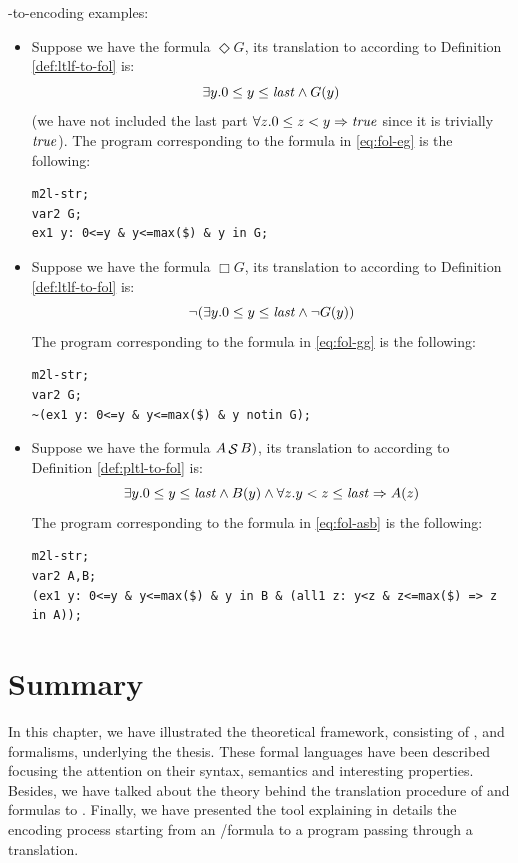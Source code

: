 \begin{example}
\FOL-to-\MONA encoding examples:\\
\begin{itemize}
\item Suppose we have the \LTLf formula $\Diamond G$, its translation to \FOL according to Definition \ref{def:ltlf-to-fol} is:
\begin{equation}\label{eq:fol-eg}
\exists y. 0 \le y \le \mathit{last} \wedge G(y)
\end{equation}
(we have not included the last part $\forall z. 0 \le z < y \Rightarrow \mathit{true}$ since it is trivially $\mathit{true}$).
The \MONA program corresponding to the formula in \ref{eq:fol-eg} is the following:
\begin{lstlisting}[style=mona]
m2l-str;
var2 G;
ex1 y: 0<=y & y<=max($) & y in G;
\end{lstlisting}

\item Suppose we have the \LTLf formula $\Box G$, its translation to \FOL according to Definition \ref{def:ltlf-to-fol} is:
\begin{equation}\label{eq:fol-gg}
\lnot (\exists y. 0 \le y \le \mathit{last} \wedge \lnot G(y))
\end{equation}
The \MONA program corresponding to the formula in \ref{eq:fol-gg} is the following:
\begin{lstlisting}[style=mona]
m2l-str;
var2 G;
~(ex1 y: 0<=y & y<=max($) & y notin G);
\end{lstlisting}

\item Suppose we have the \PLTL formula $A \mathop{\mathcal{S}} B)$, its translation to \FOL according to Definition \ref{def:pltl-to-fol} is:
\begin{equation}\label{eq:fol-asb}
\exists y. 0 \le y \le \mathit{last} \wedge B(y) \wedge \forall z. y < z \le \mathit{last} \Rightarrow A(z)
\end{equation}
The \MONA program corresponding to the formula in \ref{eq:fol-asb} is the following:
\begin{lstlisting}[style=mona]
m2l-str;
var2 A,B;
(ex1 y: 0<=y & y<=max($) & y in B & (all1 z: y<z & z<=max($) => z in A));
\end{lstlisting}
\end{itemize}
\end{example}
\section{Summary}
In this chapter, we have illustrated the theoretical framework, consisting of \LTL, \LTLf and \PLTL formalisms, underlying the thesis. These formal languages have been described focusing the attention on their syntax, semantics and interesting properties. Besides, we have talked about the theory behind the translation procedure of \LTLf and \PLTL formulas to \DFAs. Finally, we have presented the \MONA tool explaining in details the encoding process starting from an \LTLf/\PLTL formula to a \MONA program passing through a \FOL translation.